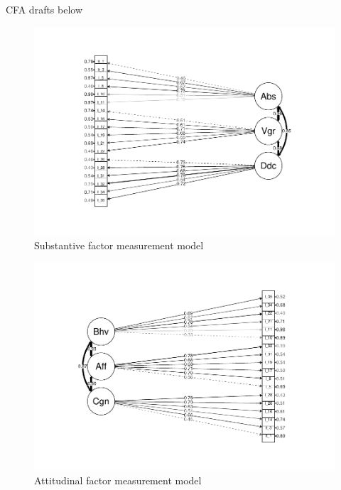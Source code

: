 \documentclass[
  english,
  man]{apa6}
\begin{document}
CFA drafts below

\begin{figure}
\centering
\includegraphics{SIOPpapaja_files/figure-latex/CFAatt1-1.pdf}
\caption{\label{fig:CFAatt1}Substantive factor measurement model}
\end{figure}

\begin{figure}
\centering
\includegraphics{SIOPpapaja_files/figure-latex/CFAatt2-1.pdf}
\caption{\label{fig:CFAatt2}Attitudinal factor measurement model}
\end{figure}
\end{document}
